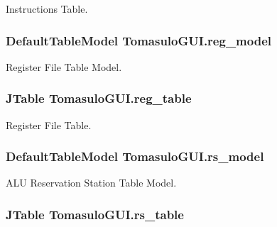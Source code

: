 \-Instructions \-Table. 

\hypertarget{classTomasuloGUI_a70e2e15d3c1154ecc5a049f373d1178d}{
\subsubsection[{reg\-\_\-model}]{\setlength{\rightskip}{0pt plus 5cm}\-Default\-Table\-Model {\bf \-Tomasulo\-G\-U\-I.\-reg\-\_\-model}}}\label{classTomasuloGUI_a70e2e15d3c1154ecc5a049f373d1178d}


\-Register \-File \-Table \-Model. 

\hypertarget{classTomasuloGUI_a5d9e4b23a54f429c9f0135e492bc7609}{
\subsubsection[{reg\-\_\-table}]{\setlength{\rightskip}{0pt plus 5cm}\-J\-Table {\bf \-Tomasulo\-G\-U\-I.\-reg\-\_\-table}}}\label{classTomasuloGUI_a5d9e4b23a54f429c9f0135e492bc7609}


\-Register \-File \-Table. 

\hypertarget{classTomasuloGUI_a1f5a9be366c1157ec2a5eb54de8c1b5b}{
\subsubsection[{rs\-\_\-model}]{\setlength{\rightskip}{0pt plus 5cm}\-Default\-Table\-Model {\bf \-Tomasulo\-G\-U\-I.\-rs\-\_\-model}}}\label{classTomasuloGUI_a1f5a9be366c1157ec2a5eb54de8c1b5b}


\-A\-L\-U \-Reservation \-Station \-Table \-Model. 

\hypertarget{classTomasuloGUI_a6ecd99ff02c80d24ecb2aa0ba2635fef}{
\subsubsection[{rs\-\_\-table}]{\setlength{\rightskip}{0pt plus 5cm}\-J\-Table {\bf \-Tomasulo\-G\-U\-I.\-rs\-\_\-table}}}\label{classTomasuloGUI_a6ecd99ff02c80d24ecb2aa0ba2635fef}


